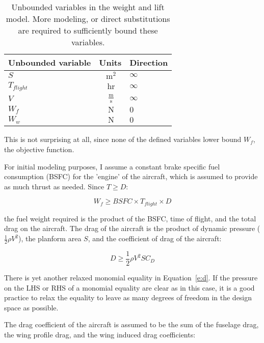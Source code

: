 \begin{footnotesize}
\begin{table}
    \centering
    \begin{tabular}{ l c l }
        \toprule
        Unbounded variable & Units & Direction \\
        \midrule
        $S$ & $~\mathrm{m^{2}}$ & $\infty$ \\
        $T_{flight}$ & $~\mathrm{hr}$ & $\infty$ \\
        $V$ &  $~\mathrm{\tfrac{m}{s}}$  & $\infty$ \\
        $W_f$ & $~\mathrm{N}$ & $0$ \\
        $W_w$ & $~\mathrm{N}$  & $0$ \\
        \bottomrule
    \end{tabular}
    \label{tab:WandL_unbounded}
    \caption{Unbounded variables in the weight and lift model. More modeling, or direct
    substitutions are required to
    sufficiently bound these variables.}
\end{table} \end{footnotesize}

This is not surprising at all, since none of the defined variables lower bound $W_f$,
the objective function.

For initial modeling purposes, I assume a constant brake
specific fuel consumption (BSFC) for the 'engine' of the aircraft, which is assumed
to provide as much thrust as needed. Since $T \geq D$:

\begin{equation}
    W_f \geq BSFC \times T_{flight} \times D
\end{equation}

the fuel weight required is the product of the BSFC, time of flight, and the total drag on the aircraft.
The drag of the aircraft is the product of dynamic pressure ($\frac{1}{2} \rho V^2$),
the planform area $S$, and the coefficient of drag of the aircraft:

\begin{equation} 
    D \geq \frac{1}{2} \rho V^2 S  C_D
\label{e:d}
\end{equation}

There is yet another relaxed monomial equality in Equation~\ref{e:d}.
If the pressure on the \gls{LHS} or \gls{RHS} of a monomial equality are clear as in this case,
it is a good practice to relax the equality to leave as many degrees of freedom
in the design space as possible.

The drag coefficient of the aircraft is assumed to be the sum of the fuselage drag,
the wing profile drag, and the wing induced drag coefficients:

